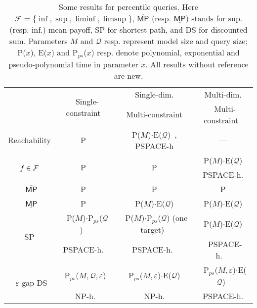 \documentclass{llncs}
\newcommand*{\mpsup}{\ensuremath{\overline{\mathsf{MP}}}}
\newcommand*{\mpinf}{\ensuremath{\underline{\mathsf{MP}}}}
\newcommand{\query}{\ensuremath{\mathcal{Q}} }
\newcommand\NPTIME{\textrm{\sf NP}}
\newcommand\PTIME{\textrm{\sf P}}
\newcommand\PSPACE{\textrm{\sf PSPACE}}
\begin{document}
\def\arraystretch{1.2}
\begin{table}[t]
  \footnotesize
  \centering
  \begin{tabular}{|c||c|c|c|}
    \cline{2-4} \multicolumn{1}{c||}{} & \multirow{2}{*}{~Single-constraint~} & Single-dim. & ~Multi-dim.~ \\
    \multicolumn{1}{c||}{} & & ~Multi-constraint~ & ~Multi-constraint~\\
    \hline
    \hline
    Reachability & \PTIME~\cite{Puterman-wiley94} & P($M$)$\cdot$E($\query$)~\cite{EKVY-lmcs08}, \PSPACE-h & --- \\
    \hline
    \multirow{2}{*}{~$\scriptsize f \in \mathcal{F}$~} & \multirow{2}{*}{\PTIME~\cite{CH-ilc09}} & \multirow{2}{*}{\PTIME} & ~P($M$)$\cdot$E($\query$)~ \\
    & & & \PSPACE-h.\\
    \hline
    ~$\mpsup$ & ~\PTIME~\cite{Puterman-wiley94}~ & \PTIME & \PTIME\\
    \hline
    ~$\mpinf$ & ~\PTIME~\cite{Puterman-wiley94}~ & ~P($M$)$\cdot$E($\query$)~ & ~P($M$)$\cdot$E($\query$)~\\
    \hline
    \multirow{2}{*}{~SP~} &  ~P($M$)$\cdot$P$_{ps}$($\query$)~\cite{HaaseK14}~ & ~P($M$)$\cdot$P$_{ps}$($\query$) (one target)~ & ~P($M$)$\cdot$E($\query$)~\\
    & ~\PSPACE-h.~\cite{HaaseK14}~ & ~\PSPACE-h.~\cite{HaaseK14}~ & ~\PSPACE-h.~\cite{HaaseK14}~\\
    \hline
    \multirow{2}{*}{~$\varepsilon$-gap DS} & ~P$_{ps}$($M, \query, \varepsilon$)~ & ~P$_{ps}$($M,\varepsilon$)$\cdot$E($\query$)~ & ~P$_{ps}$($M,\varepsilon$)$\cdot$E($\query$)~\\
    & \NPTIME-h. & \NPTIME-h. & \PSPACE-h.\\
    \hline
  \end{tabular}
  \vspace{2mm}
  \caption{Some results for percentile queries. Here $\mathcal{F} = \{\inf, \sup, \liminf, \limsup\}$, $\mpsup$ (resp. $\mpinf$) stands for sup. (resp. inf.) mean-payoff, SP for shortest path, and DS for discounted sum. Parameters $M$ and $\query$ resp. represent model size and query size; P($x$), E($x$) and P$_{ps}$($x$) resp. denote polynomial, exponential and pseudo-polynomial time in parameter $x$. All results without reference are new.}
  \vspace{-6mm}
  \label{table}
\end{table}
\end{document}
